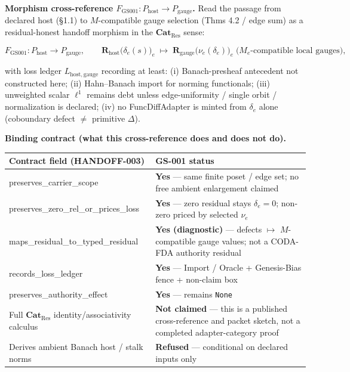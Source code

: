 \documentclass[
  11pt,
]{article}
\begin{document}
\textbf{Morphism cross-reference \(F_{\mathrm{GS001}}\colon P_{\mathrm{host}}\to P_{\mathrm{gauge}}\).} Read the passage from declared host (§1.1) to \(M\)-compatible gauge selection (Thms 4.2 / edge sum) as a residual-honest handoff morphism in the \(\mathbf{Cat}_{\mathrm{Res}}\) sense:

\[
F_{\mathrm{GS001}}
\colon
P_{\mathrm{host}}
\longrightarrow
P_{\mathrm{gauge}},
\qquad
\mathbf{R}_{\mathrm{host}}
\bigl(\delta_e(s)\bigr)_e
\;\longmapsto\;
\mathbf{R}_{\mathrm{gauge}}
\bigl(\nu_e(\delta_e)\bigr)_e
\;\text{(}M_e\text{-compatible local gauges)},
\]

with loss ledger \(L_{\mathrm{host},\mathrm{gauge}}\) recording at least: (i) Banach-presheaf antecedent not constructed here; (ii) Hahn--Banach import for norming functionals; (iii) unweighted scalar \(\ell^1\) remains debt unless edge-uniformity / single orbit / normalization is declared; (iv) no FuncDiffAdapter is minted from \(\delta_e\) alone (coboundary defect \(\neq\) primitive \(\Delta\)).

\textbf{Binding contract (what this cross-reference does and does not do).}

\begin{longtable}[]{@{}
  >{\raggedright\arraybackslash}p{}
  >{\raggedright\arraybackslash}p{}@{}}
\toprule\noalign{}
\begin{minipage}[b]{\linewidth}\raggedright
Contract field (HANDOFF-003)
\end{minipage} & \begin{minipage}[b]{\linewidth}\raggedright
GS-001 status
\end{minipage} \\
\midrule\noalign{}
\endhead
\bottomrule\noalign{}
\endlastfoot
preserves\_carrier\_scope & \textbf{Yes} --- same finite poset / edge set; no free ambient enlargement claimed \\
preserves\_zero\_rel\_or\_prices\_loss & \textbf{Yes} --- zero residual stays \(\delta_e=0\); non-zero priced by selected \(\nu_e\) \\
maps\_residual\_to\_typed\_residual & \textbf{Yes (diagnostic)} --- defects \(\mapsto\) \(M\)-compatible gauge values; not a CODA-FDA authority residual \\
records\_loss\_ledger & \textbf{Yes} --- Import / Oracle + Genesis-Bias fence + non-claim box \\
preserves\_authority\_effect & \textbf{Yes} --- remains \texttt{None} \\
Full \(\mathbf{Cat}_{\mathrm{Res}}\) identity/associativity calculus & \textbf{Not claimed} --- this is a published cross-reference and packet sketch, not a completed adapter-category proof \\
Derives ambient Banach host / stalk norms & \textbf{Refused} --- conditional on declared inputs only \\
\end{longtable}
\end{document}
